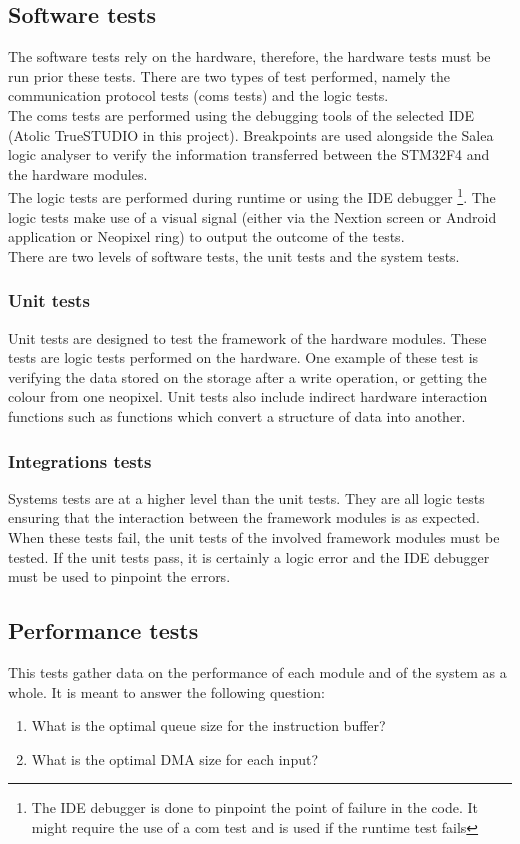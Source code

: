 \subsection{Software tests}
The software tests rely on the hardware, therefore, the hardware tests must be run prior these tests. There are two types of test performed, namely the communication protocol tests (coms tests) and the logic tests.\\
The coms tests are performed using the debugging tools of the selected IDE (Atolic TrueSTUDIO in this project). Breakpoints are used alongside the Salea logic analyser to verify the information transferred between the STM32F4 and the hardware modules.\\
The logic tests are performed during runtime or using the IDE debugger \footnote{The IDE debugger is done to pinpoint the point of failure in the code. It might require the use of a com test and is used if the runtime test fails}. The logic tests make use of a visual signal (either via the Nextion screen or Android application or Neopixel ring) to output the outcome of the tests.\\
There are two levels of software tests, the unit tests and the system tests.
\subsubsection{Unit tests}
Unit tests are designed to test the framework of the hardware modules. These tests are logic tests performed on the hardware. One example of these test is verifying the data stored on the storage after a write operation, or getting the colour from one neopixel. Unit tests also include indirect hardware interaction functions such as functions which convert a structure of data into another. 
\subsubsection{Integrations tests}
Systems tests are at a higher level than the unit tests. They are all logic tests ensuring that the interaction between the framework modules is as expected. When these tests fail, the unit tests of the involved framework modules must be tested. If the unit tests pass, it is certainly a logic error and the IDE debugger must be used to pinpoint the errors.

\subsection{Performance tests}
This tests gather data on the performance of each module and of the system as a whole. It is meant to answer the following question:
\begin{enumerate}
\item What is the optimal queue size for the instruction buffer?
\item What is the optimal DMA size for each input? 
\end{enumerate} 
